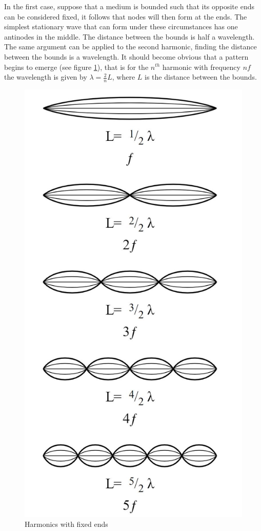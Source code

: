 In the first case, suppose that a medium is bounded such that its opposite ends can be considered fixed, it follows that nodes will then form at the ends. The simplest stationary wave that can form under these circumstances has one antinodes in the middle. The distance between the bounds is half a wavelength. The same argument can be applied to the second harmonic, finding the distance between the bounds is a wavelength. It should become obvious that a pattern begins to emerge (see figure \ref{fig:harmonic-1}), that is for the $n^{th}$ harmonic with frequency $nf$ the wavelength is given by $\lambda = \frac{2}{n} L$, where $L$ is the distance between the bounds.  

\begin{figure}[h!]
    \centering
    \includegraphics[scale=0.5]{notes/images/Harmonic-1.JPG}
    \caption{Harmonics with fixed ends}
    \label{fig:harmonic-1}
\end{figure}
\FloatBarrier

